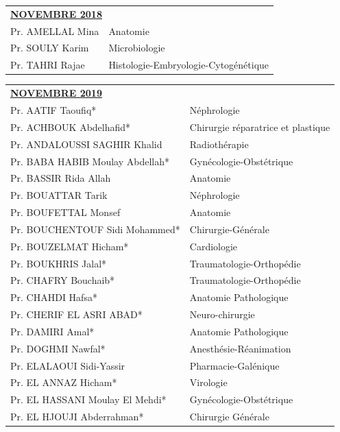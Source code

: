 \begin{table}[H]
  \begin{tabular}{l l}
    \multicolumn{2}{l}{\textbf{\underline{NOVEMBRE 2018}}}\vspace*{0.5em}\\
    Pr. AMELLAL Mina & Anatomie \\
    Pr. SOULY Karim & Microbiologie \\
    Pr. TAHRI Rajae & Histologie-Embryologie-Cytogénétique \\
  \end{tabular}
\end{table}


\begin{table}[H]
  \begin{tabular}{l l}
    \multicolumn{2}{l}{\textbf{\underline{NOVEMBRE 2019}}}\vspace*{0.5em}\\
    Pr. AATIF Taoufiq* & Néphrologie \\
    Pr. ACHBOUK Abdelhafid* & Chirurgie réparatrice et plastique \\
    Pr. ANDALOUSSI SAGHIR Khalid & Radiothérapie \\
    Pr. BABA HABIB Moulay Abdellah* & Gynécologie-Obstétrique \\
    Pr. BASSIR Rida Allah & Anatomie \\
    Pr. BOUATTAR Tarik & Néphrologie \\
    Pr. BOUFETTAL Monsef & Anatomie \\
    Pr. BOUCHENTOUF Sidi Mohammed* & Chirurgie-Générale \\
    Pr. BOUZELMAT Hicham* & Cardiologie \\
    Pr. BOUKHRIS Jalal* & Traumatologie-Orthopédie \\
    Pr. CHAFRY Bouchaib* & Traumatologie-Orthopédie \\
    Pr. CHAHDI Hafsa* & Anatomie Pathologique \\
    Pr. CHERIF EL ASRI ABAD* & Neuro-chirurgie \\
    Pr. DAMIRI Amal* & Anatomie Pathologique \\
    Pr. DOGHMI Nawfal* & Anesthésie-Réanimation \\
    Pr. ELALAOUI Sidi-Yassir & Pharmacie-Galénique \\
    Pr. EL ANNAZ Hicham* & Virologie \\
    Pr. EL HASSANI Moulay El Mehdi* & Gynécologie-Obstétrique \\
    Pr. EL HJOUJI Abderrahman* & Chirurgie Générale \\

\end{tabular}
\end{table}
